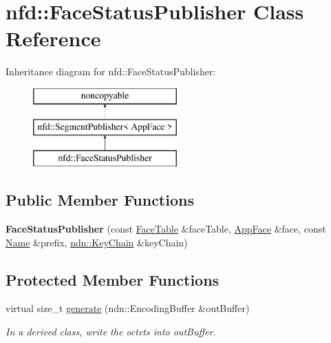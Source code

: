 \hypertarget{classnfd_1_1FaceStatusPublisher}{}\section{nfd\+:\+:Face\+Status\+Publisher Class Reference}
\label{classnfd_1_1FaceStatusPublisher}
Inheritance diagram for nfd\+:\+:Face\+Status\+Publisher\+:\begin{figure}[H]
\begin{center}
\leavevmode
\includegraphics[height=3.000000cm]{classnfd_1_1FaceStatusPublisher}
\end{center}
\end{figure}
\subsection*{Public Member Functions}
\begin{DoxyCompactItemize}
\item 
{\bfseries Face\+Status\+Publisher} (const \hyperlink{classnfd_1_1FaceTable}{Face\+Table} \&face\+Table, \hyperlink{classnfd_1_1AppFace}{App\+Face} \&face, const \hyperlink{classndn_1_1Name}{Name} \&prefix, \hyperlink{classndn_1_1security_1_1KeyChain}{ndn\+::\+Key\+Chain} \&key\+Chain)\hypertarget{classnfd_1_1FaceStatusPublisher_a0f9c66d45d7e714f176e964fb423c9ab}{}\label{classnfd_1_1FaceStatusPublisher_a0f9c66d45d7e714f176e964fb423c9ab}

\end{DoxyCompactItemize}
\subsection*{Protected Member Functions}
\begin{DoxyCompactItemize}
\item 
virtual size\+\_\+t \hyperlink{classnfd_1_1FaceStatusPublisher_a9f266d532a5019548b8e422e99576afb}{generate} (ndn\+::\+Encoding\+Buffer \&out\+Buffer)\hypertarget{classnfd_1_1FaceStatusPublisher_a9f266d532a5019548b8e422e99576afb}{}\label{classnfd_1_1FaceStatusPublisher_a9f266d532a5019548b8e422e99576afb}

\begin{DoxyCompactList}\small\item\em In a derived class, write the octets into out\+Buffer. \end{DoxyCompactList}\end{DoxyCompactItemize}
